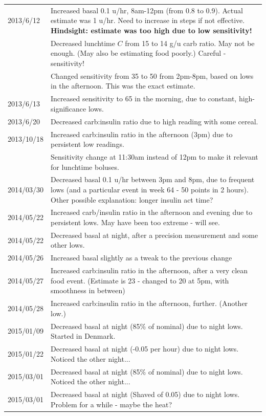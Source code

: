 \begin{table}[htdp] %
\begin{center}
\begin{tabular}{|p{1in}|p{5in}|}
\hline
2013/6/12  & Increased basal 0.1 u/hr, 8am-12pm (from 0.8 to 0.9). Actual estimate was 1 u/hr. Need to increase in steps if not effective. {\bf Hindsight: estimate was too high due to low sensitivity!} \\
           & Decreased lunchtime $C$ from 15 to 14 g/u carb ratio. May not be enough. (May also be estimating food poorly.) Careful - sensitivity! \\
           & Changed sensitivity from 35 to 50 from 2pm-8pm, based on lows in the afternoon. This was the exact estimate. 
\\ \hline
2013/6/13  & Increased sensitivity to 65 in the morning, due to constant, high-significance lows. \\ \hline
2013/6/20  & Decreased carb:insulin ratio due to high reading with some cereal. \\ \hline
2013/10/18 & Increased carb:insulin ratio in the afternoon (3pm) due to persistent low readings. \\
           & Sensitivity change at 11:30am instead of 12pm to make it relevant for lunchtime boluses. \\ \hline
2014/03/30 & Decreased basal 0.1 u/hr between 3pm and 8pm, due to frequent lows (and a particular event in week 64 - 50 points in 2 hours). Other possible explanation: longer insulin act time? \\ \hline
2014/05/22 & Increased carb/insulin ratio in the afternoon and evening due to persistent lows. May have been too extreme - will see. \\ 
2014/05/22 & Decreased basal at night, after a precision measurement and some other lows. \\ \hline
2014/05/26 & Increased basal slightly as a tweak to the previous change \\ \hline
2014/05/27 & Increased carb:insulin ratio in the afternoon, after a very clean food event. (Estimate is 23 - changed to 20 at 5pm, with smoothness in between) \\ \hline
2014/05/28 & Increased carb:insulin ratio in the afternoon, further. (Another low.)\\ \hline
2015/01/09 & Decreased basal at night (85\% of nominal) due to night lows. Started in Denmark. \\ \hline
2015/01/22 & Decreased basal at night (-0.05 per hour) due to night lows. Noticed the other night... \\ \hline
2015/03/01 & Decreased basal at night (85\% of nominal) due to night lows. Noticed the other night... \\ \hline
2015/03/01 & Decreased basal at night (Shaved of 0.05) due to night lows. Problem for a while - maybe the heat? \\ \hline
\end{tabular}
\end{center}
\end{table}%

